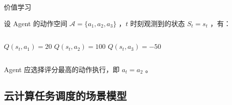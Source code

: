 \begin{frame}{价值学习}

    设 Agent 的动作空间 $\mathcal{A} = \{a_1, a_2, a_3\}$ ，$t$ 时刻观测到的状态 $S_t = s_t$ ，有：

    \begin{center}
        \begin{minipage}{0.7\textwidth}
            \begin{columns}
                $Q(s_t, a_1) = 20$
                $Q(s_t, a_2) = 100$
                $Q(s_t, a_3) = -50$
            \end{columns}
        \end{minipage}
    \end{center}

    Agent 应选择评分最高的动作执行，即 $a_t = a_2$ 。


\end{frame}

\subsection{云计算任务调度的场景模型}

